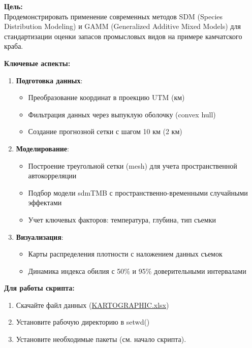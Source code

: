 \documentclass[
  letterpaper,
  DIV=11,
  numbers=noendperiod]{scrreprt}
\begin{document}
\textbf{Цель:}\\
Продемонстрировать применение современных методов SDM (Species
Distribution Modeling) и GAMM (Generalized Additive Mixed Models) для
стандартизации оценки запасов промысловых видов на примере камчатского
краба.

\textbf{Ключевые аспекты:}

\begin{enumerate}
\def\labelenumi{\arabic{enumi}.}
\item
  \textbf{Подготовка данных}:

  \begin{itemize}
  \item
    Преобразование координат в проекцию UTM (км)
  \item
    Фильтрация данных через выпуклую оболочку (convex hull)
  \item
    Создание прогнозной сетки с шагом 10 км (2 км)
  \end{itemize}
\item
  \textbf{Моделирование}:

  \begin{itemize}
  \item
    Построение треугольной сетки (mesh) для учета пространственной
    автокорреляции
  \item
    Подбор модели sdmTMB с пространственно-временными случайными
    эффектами
  \item
    Учет ключевых факторов: температура, глубина, тип съемки
  \end{itemize}
\item
  \textbf{Визуализация}:

  \begin{itemize}
  \item
    Карты распределения плотности с наложением данных съемок
  \item
    Динамика индекса обилия с 50\% и 95\% доверительными интервалами
  \end{itemize}
\end{enumerate}

\textbf{Для работы скрипта:}

\begin{enumerate}
\def\labelenumi{\arabic{enumi}.}
\item
  Скачайте файл данных
  (\href{https://mombus.github.io/cRab/data/KARTOGRAPHIC.xlsx}{KARTOGRAPHIC.xlsx})
\item
  Установите рабочую директорию в setwd()
\item
  Установите необходимые пакеты (см. начало скрипта).
\end{enumerate}
\end{document}
